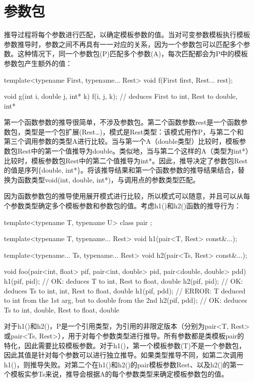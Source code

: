 \section{参数包}

推导过程将每个参数进行匹配，以确定模板参数的值。当对可变参数模板执行模板参数推导时，参数之间不再具有一一对应的关系，因为一个参数包可以匹配多个参数。这种情况下，同一个参数包(P)匹配多个参数(A)，每次匹配都会为P中的模板参数包产生额外的值：

\begin{cpp}
template<typename First, typename... Rest>
void f(First first, Rest... rest);

void g(int i, double j, int* k)
{
	f(i, j, k); // deduces First to int, Rest to {double, int*}
}
\end{cpp}

第一个函数参数的推导很简单，不涉及参数包。第二个函数参数rest是一个函数参数包，类型是一个包扩展(Rest…)，模式是Rest类型：该模式用作P，与第二个和第三个调用参数的类型A进行比较。当与第一个A（double类型）比较时，模板参数包Rest中的第一个值推导为double。类似地，当与第二个这样的A（类型为int*）比较时，模板参数包Rest中的第二个值推导为int*。因此，推导决定了参数包Rest的值是序列\{double, int*\}。将该推导结果和第一个函数参数的推导结果结合，替换为函数类型void(int, double, int*)，与调用点的参数类型匹配。

因为函数参数包的推导使用展开模式进行比较，所以模式可以随意，并且可以从每个参数类型确定多个模板参数和参数包的值。考虑h1()和h2()函数的推导行为：

\begin{cpp}
template<typename T, typename U> class pair { };

template<typename T, typename... Rest>
	void h1(pair<T, Rest> const&...);

template<typename... Ts, typename... Rest>
	void h2(pair<Ts, Rest> const&...);

void foo(pair<int, float> pif, pair<int, double> pid,
pair<double, double> pdd)
{
	h1(pif, pid); // OK: deduces T to int, Rest to {float, double}
	h2(pif, pid); // OK: deduces Ts to {int, int}, Rest to {float, double}
	h1(pif, pdd); // ERROR: T deduced to int from the 1st arg, but to double from the 2nd
	h2(pif, pdd); // OK: deduces Ts to {int, double}, Rest to {float, double}
}
\end{cpp}

对于h1()和h2()，P是一个引用类型，为引用的非限定版本（分别为pair<T, Rest>或pair<Ts, Rest>），用于对每个参数类型进行推导。所有参数都是类模板pair的特化，因此需要比较模板参数。对于h1()，第一个模板参数(T)不是一个参数包，因此其值是针对每个参数可以进行独立推导。如果类型推导不同，如第二次调用h1()，则推导失败。对第二个在h1()和h2()的pair模板参数Rest、以及h2()的第一个模板实参Ts来说，推导会根据A的每个参数类型来确定模板参数包的值。

